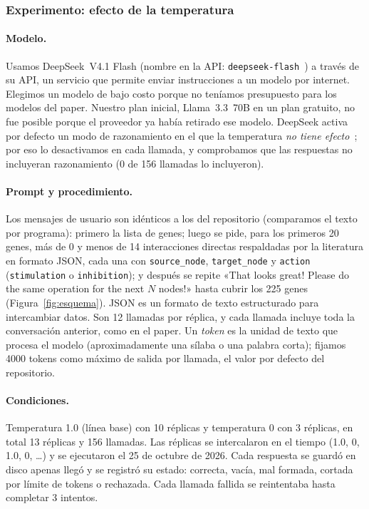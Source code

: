 \documentclass[unnumsec,webpdf,contemporary,large]{oup-authoring-template}
\begin{document}
\subsubsection{Experimento: efecto de la temperatura}

\paragraph{Modelo.} Usamos DeepSeek~V4.1 Flash (nombre en la API: \texttt{deepseek-flash}~\cite{deepseek_models}) a través de su API, un servicio que permite enviar instrucciones a un modelo por internet. Elegimos un modelo de bajo costo porque no teníamos presupuesto para los modelos del paper. Nuestro plan inicial, Llama~3.3~70B en un plan gratuito, no fue posible porque el proveedor ya había retirado ese modelo. DeepSeek activa por defecto un modo de razonamiento en el que la temperatura \emph{no tiene efecto}~\cite{deepseek_thinking}; por eso lo desactivamos en cada llamada, y comprobamos que las respuestas no incluyeran razonamiento (0 de 156 llamadas lo incluyeron).

\paragraph{Prompt y procedimiento.} Los mensajes de usuario son idénticos a los del repositorio (comparamos el texto por programa): primero la lista de genes; luego se pide, para los primeros 20 genes, más de 0 y menos de 14 interacciones directas respaldadas por la literatura en formato JSON, cada una con \texttt{source\_node}, \texttt{target\_node} y \texttt{action} (\texttt{stimulation} o \texttt{inhibition}); y después se repite «That looks great! Please do the same operation for the next $N$ nodes!» hasta cubrir los 225 genes (Figura~\ref{fig:esquema}). JSON es un formato de texto estructurado para intercambiar datos. Son 12 llamadas por réplica, y cada llamada incluye toda la conversación anterior, como en el paper. Un \emph{token} es la unidad de texto que procesa el modelo (aproximadamente una sílaba o una palabra corta); fijamos 4000 tokens como máximo de salida por llamada, el valor por defecto del repositorio.

\paragraph{Condiciones.} Temperatura 1.0 (línea base) con 10 réplicas y temperatura 0 con 3 réplicas, en total 13 réplicas y 156 llamadas. Las réplicas se intercalaron en el tiempo (1.0, 0, 1.0, 0, \ldots) y se ejecutaron el 25 de octubre de 2026. Cada respuesta se guardó en disco apenas llegó y se registró su estado: correcta, vacía, mal formada, cortada por límite de tokens o rechazada. Cada llamada fallida se reintentaba hasta completar 3 intentos.
\end{document}
